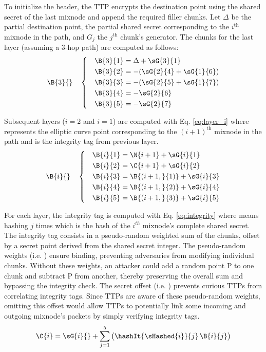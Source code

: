 To initialize the header, the TTP encrypts the destination point using the shared secret of the last mixnode and append the required filler chunks. 
Let $ \Delta $ be the partial destination point,  the partial shared secret corresponding to the $ i^\text{th} $ mixnode in the path, and $ G_j $ the $ j^\text{th} $ chunk's generator. 
The chunks for the last layer (assuming a 3-hop path) are computed as follows:
\begin{equation}
\B{3}{} \quad \left\{ \quad
\begin{aligned}
    \B{3}{1} &= \Delta       + \sG{3}{1} \\
    \B{3}{2} &= - (\sG{2}{4} + \sG{1}{6}) \\
    \B{3}{3} &= - (\sG{2}{5} + \sG{1}{7}) \\
    \B{3}{4} &= - \sG{2}{6} \\
    \B{3}{5} &= - \sG{2}{7} \\
\end{aligned}
\right.
\label{eq:last_layer}
\end{equation}

\noindent
Subsequent layers ($ i = 2 $ and $ i = 1 $) are computed with Eq. \ref{eq:layer_i} where  represents the 
elliptic curve point corresponding to the $ (i+1)^\text{th} $ mixnode in the path and  is the integrity tag from previous layer.
\begin{equation}
\B{i}{} \quad \left\{ \quad
\begin{aligned}
    \B{i}{1} &= \N{i+1} + \sG{i}{1}\\
    \B{i}{2} &= \C{i+1} + \sG{i}{2} \\
    \B{i}{3} &= \B{(i+1,}{1)} + \sG{i}{3} \\
    \B{i}{4} &= \B{(i+1,}{2)} + \sG{i}{4} \\
    \B{i}{5} &= \B{(i+1,}{3)} + \sG{i}{5} \\
\end{aligned}
\right.
\label{eq:layer_i}
\end{equation}

\noindent
For each layer, the integrity tag is computed with Eq. \ref{eq:integrity} where  means hashing $j$ times  which is the hash of the $i^{th}$ mixnode's complete shared secret.
The integrity tag consists in a pseudo-random weighted sum of the chunks, offset by a secret point derived from the shared secret integer.
The pseudo-random weights (i.e. ) ensure binding, preventing adversaries from modifying individual chunks.
Without these weights, an attacker could add a random point P to one chunk and subtract P from another, thereby preserving the overall sum and bypassing the integrity check.
The secret offset (i.e. ) prevents curious TTPs from correlating integrity tags.
Since TTPs are aware of these pseudo-random weights, omitting this offset would allow TTPs to potentially link some incoming and outgoing mixnode's packets by simply verifying integrity tags.
\begin{equation}
\C{i} = \sG{i}{} + \sum_{j=1}^{5} \big( \hashIt{\sHashed{i}}{j} \, \B{i}{j} \big)
\label{eq:integrity}
\end{equation}

